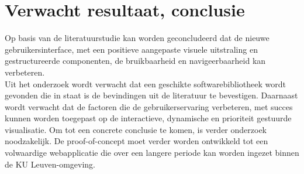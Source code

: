 \section{Verwacht resultaat, conclusie}%
\label{sec:verwachte_resultaten}
Op basis van de literatuurstudie kan worden geconcludeerd dat de nieuwe gebruikersinterfa\-ce, met een positieve aangepaste visuele uitstraling en gestructureerde componenten, de bruikbaarheid en navigeerbaarheid kan verbeteren. \\Uit het onderzoek wordt verwacht dat een geschikte softwarebibliotheek wordt gevonden die in staat is de bevindingen uit de literatuur te bevestigen. Daarnaast wordt verwacht dat de factoren die de gebruikerservaring verbeteren, met succes kunnen worden toegepast op de interactieve, dynamische en prioriteit gestuurde visualisatie. Om tot een concrete conclusie te komen, is verder onderzoek noodzakelijk. De proof-of-concept moet verder worden ontwikkeld tot een volwaardige webapplicatie die over een langere periode kan worden ingezet binnen de KU Leu\-ven-omgeving.

